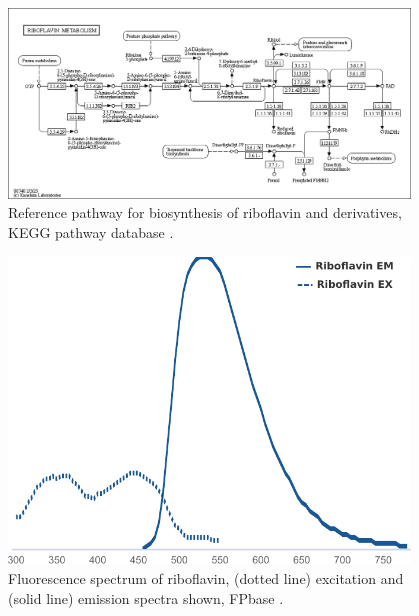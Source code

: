 \begin{figure}
  \centering
  \includegraphics[width=0.95\textwidth]{kegg-flavin}
  \caption{
    Reference pathway for biosynthesis of riboflavin and derivatives, KEGG pathway database \parencite{kanehisaKEGGTaxonomybasedAnalysis2023}.
    }
  \label{fig:intro-flavin-kegg}
\end{figure}

\begin{figure}
  \centering
  \includegraphics[width=0.95\textwidth]{fpbase-riboflavin-adapted}
  \caption{
    Fluorescence spectrum of riboflavin, (dotted line) excitation and (solid line) emission spectra shown, FPbase \parencite{lambertUsingFPbaseFluorescent2023}.
    }
  \label{fig:intro-flavin-spectra}
\end{figure}


